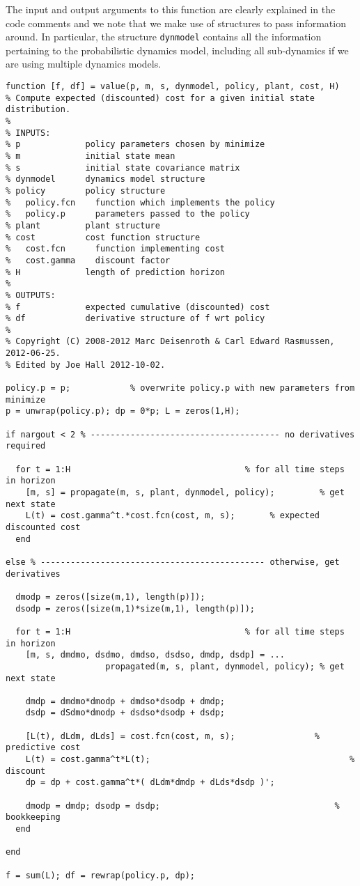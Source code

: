 The input and output arguments to this function are clearly explained in the code comments and we note that we make use of structures to pass information around. In particular, the structure \texttt{dynmodel} contains all the information pertaining to the probabilistic dynamics model, including all sub-dynamics if we are using multiple dynamics models.



\begin{lstlisting}
function [f, df] = value(p, m, s, dynmodel, policy, plant, cost, H)
% Compute expected (discounted) cost for a given initial state distribution.
%
% INPUTS:
% p             policy parameters chosen by minimize
% m             initial state mean
% s             initial state covariance matrix
% dynmodel      dynamics model structure
% policy        policy structure
%   policy.fcn    function which implements the policy
%   policy.p      parameters passed to the policy
% plant         plant structure
% cost          cost function structure
%   cost.fcn      function implementing cost
%   cost.gamma    discount factor
% H             length of prediction horizon
%
% OUTPUTS:
% f             expected cumulative (discounted) cost
% df            derivative structure of f wrt policy
%
% Copyright (C) 2008-2012 Marc Deisenroth & Carl Edward Rasmussen, 2012-06-25.
% Edited by Joe Hall 2012-10-02.

policy.p = p;            % overwrite policy.p with new parameters from minimize
p = unwrap(policy.p); dp = 0*p; L = zeros(1,H);
  
if nargout < 2 % -------------------------------------- no derivatives required
  
  for t = 1:H                                   % for all time steps in horizon
    [m, s] = propagate(m, s, plant, dynmodel, policy);         % get next state
    L(t) = cost.gamma^t.*cost.fcn(cost, m, s);       % expected discounted cost
  end
    
else % --------------------------------------------- otherwise, get derivatives

  dmodp = zeros([size(m,1), length(p)]);
  dsodp = zeros([size(m,1)*size(m,1), length(p)]);
    
  for t = 1:H                                   % for all time steps in horizon      
    [m, s, dmdmo, dsdmo, dmdso, dsdso, dmdp, dsdp] = ...
                    propagated(m, s, plant, dynmodel, policy); % get next state
      
    dmdp = dmdmo*dmodp + dmdso*dsodp + dmdp;
    dsdp = dSdmo*dmodp + dsdso*dsodp + dsdp;
      
    [L(t), dLdm, dLds] = cost.fcn(cost, m, s);                % predictive cost
    L(t) = cost.gamma^t*L(t);                                        % discount
    dp = dp + cost.gamma^t*( dLdm*dmdp + dLds*dsdp )';
        
    dmodp = dmdp; dsodp = dsdp;                                   % bookkeeping
  end
    
end
    
f = sum(L); df = rewrap(policy.p, dp);   

\end{lstlisting}



